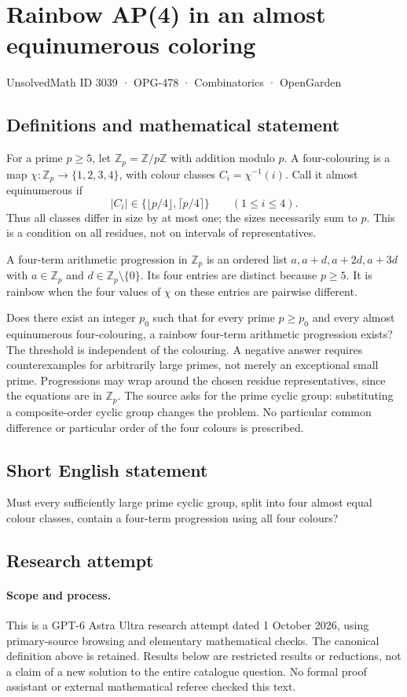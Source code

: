 \documentclass[11pt,a4paper]{article}
\begin{document}
\section*{Rainbow AP(4) in an almost equinumerous coloring}\label{3039}
{\small UnsolvedMath ID 3039 · OPG-478 · Combinatorics · OpenGarden}
\subsection{Definitions and mathematical statement}
For a prime $p\ge5$, let $\mathbb Z_p=\mathbb Z/p\mathbb Z$ with addition
modulo $p$. A four-colouring is a map $\chi:\mathbb Z_p\to\{1,2,3,4\}$,
with colour classes $C_i=\chi^{-1}(i)$. Call it almost equinumerous if
\[
 |C_i|\in\{\lfloor p/4\rfloor,\lceil p/4\rceil\}
 \qquad(1\le i\le4).
\]
Thus all classes differ in size by at most one; the sizes necessarily sum
to $p$. This is a condition on all residues, not on intervals of representatives.

A four-term arithmetic progression in $\mathbb Z_p$ is an ordered list
$a,a+d,a+2d,a+3d$ with $a\in\mathbb Z_p$ and
$d\in\mathbb Z_p\setminus\{0\}$. Its four entries are distinct because
$p\ge5$. It is rainbow when the four values of $\chi$ on these entries are
pairwise different.

Does there exist an integer $p_0$ such that for every prime $p\ge p_0$ and
every almost equinumerous four-colouring, a rainbow four-term arithmetic
progression exists? The threshold is independent of the colouring. A
negative answer requires counterexamples for arbitrarily large primes,
not merely an exceptional small prime. Progressions may wrap around the
chosen residue representatives, since the equations are in $\mathbb Z_p$.
The source asks for the prime cyclic group: substituting a composite-order
cyclic group changes the problem. No particular common difference or
particular order of the four colours is prescribed.
\subsection{Short English statement}
Must every sufficiently large prime cyclic group, split into four almost equal colour classes, contain a four-term progression using all four colours?
\subsection{Research attempt}
\paragraph{Scope and process.}
This is a GPT-6 Astra Ultra research attempt dated 1 October 2026, using
primary-source browsing and elementary mathematical checks. The canonical
definition above is retained. Results below are restricted results or
reductions, not a claim of a new solution to the entire catalogue question.
No formal proof assistant or external mathematical referee checked this text.
\end{document}
